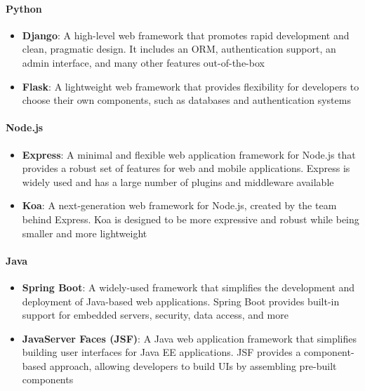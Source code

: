 \paragraph{Python}
\begin{itemize}
    \item \textbf{Django}: A high-level web framework that promotes rapid development and clean, pragmatic design. It includes an ORM, authentication support, an admin interface, and many other features out-of-the-box
    \item \textbf{Flask}: A lightweight web framework that provides flexibility for developers to choose their own components, such as databases and authentication systems
\end{itemize}

\paragraph{Node.js}
\begin{itemize}
    \item \textbf{Express}: A minimal and flexible web application framework for Node.js that provides a robust set of features for web and mobile applications. Express is widely used and has a large number of plugins and middleware available
    \item \textbf{Koa}: A next-generation web framework for Node.js, created by the team behind Express. Koa is designed to be more expressive and robust while being smaller and more lightweight
\end{itemize}

\paragraph{Java}
\begin{itemize}
    \item \textbf{Spring Boot}: A widely-used framework that simplifies the development and deployment of Java-based web applications. Spring Boot provides built-in support for embedded servers, security, data access, and more
    \item \textbf{JavaServer Faces (JSF)}: A Java web application framework that simplifies building user interfaces for Java EE applications. JSF provides a component-based approach, allowing developers to build UIs by assembling pre-built components
\end{itemize}


